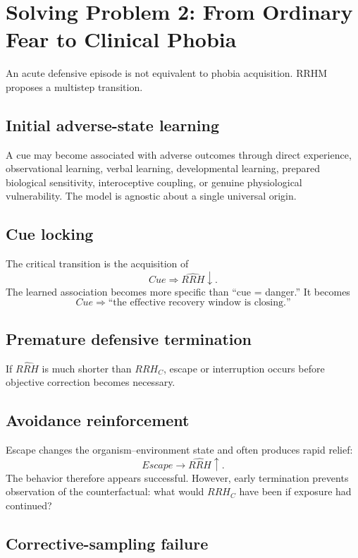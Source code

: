 \documentclass[11pt]{article}
\begin{document}
\section{Solving Problem 2: From Ordinary Fear to Clinical Phobia}

An acute defensive episode is not equivalent to phobia acquisition. RRHM proposes a multistep transition.

\subsection{Initial adverse-state learning}

A cue may become associated with adverse outcomes through direct experience, observational learning, verbal learning, developmental learning, prepared biological sensitivity, interoceptive coupling, or genuine physiological vulnerability. The model is agnostic about a single universal origin.

\subsection{Cue locking}

The critical transition is the acquisition of
\[
Cue\Rightarrow\widehat{RRH}\downarrow.
\]
The learned association becomes more specific than ``cue = danger.'' It becomes
\[
Cue\Rightarrow\text{``the effective recovery window is closing.''}
\]

\subsection{Premature defensive termination}

If $\widehat{RRH}$ is much shorter than $RRH_C$, escape or interruption occurs before objective correction becomes necessary.

\subsection{Avoidance reinforcement}

Escape changes the organism--environment state and often produces rapid relief:
\[
Escape\rightarrow\widehat{RRH}\uparrow.
\]
The behavior therefore appears successful. However, early termination prevents observation of the counterfactual: what would $RRH_C$ have been if exposure had continued?

\subsection{Corrective-sampling failure}
\end{document}
